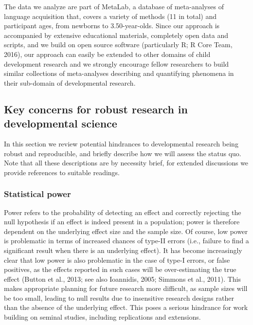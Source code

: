 \documentclass[english,floatsintext,man]{apa6}
\begin{document}
The data we analyze are part of MetaLab, a database of meta-analyses of
language acquisition that, covers a variety of methods (11 in total) and
participant ages, from newborns to 3.50-year-olds. Since our approach is
accompanied by extensive educational materials, completely open data and
scripts, and we build on open source software (particularly R; R Core
Team, 2016), our approach can easily be extended to other domains of
child development research and we strongly encourage fellow researchers
to build similar collections of meta-analyses describing and quantifying
phenomena in their sub-domain of developmental research.

\subsection{Key concerns for robust research in developmental
science}\label{key-concerns-for-robust-research-in-developmental-science}

In this section we review potential hindrances to developmental research
being robust and reproducible, and briefly describe how we will assess
the status quo. Note that all these descriptions are by necessity brief,
for extended discussions we provide references to suitable readings.

\subsubsection{Statistical power}\label{statistical-power}

Power refers to the probability of detecting an effect and correctly
rejecting the null hypothesis if an effect is indeed present in a
population; power is therefore dependent on the underlying effect size
and the sample size. Of course, low power is problematic in terms of
increased chances of type-II errors (i.e., failure to find a significant
result when there is an underlying effect). It has become increasingly
clear that low power is also problematic in the case of type-I errors,
or false positives, as the effects reported in such cases will be
over-estimating the true effect (Button et al., 2013; see also
Ioannidis, 2005; Simmons et al., 2011). This makes appropriate planning
for future research more difficult, as sample sizes will be too small,
leading to null results due to insensitive research designs rather than
the absence of the underlying effect. This poses a serious hindrance for
work building on seminal studies, including replications and extensions.
\end{document}
